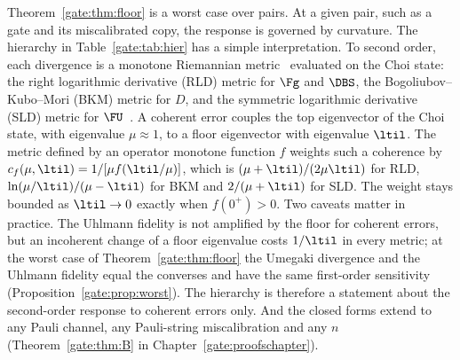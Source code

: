 Theorem~\ref{gate:thm:floor} is a worst case over pairs. At a given pair, such as a gate and its miscalibrated copy, the response is governed by curvature. The hierarchy in Table~\ref{gate:tab:hier} has a simple interpretation. To second order, each divergence is a monotone Riemannian metric~\cite{Petz1996} evaluated on the Choi state: the right logarithmic derivative (RLD) metric for $\Fg$ and $\DBS$, the Bogoliubov--Kubo--Mori (BKM) metric for $D$, and the symmetric logarithmic derivative (SLD) metric for $\FU$~\cite{Petz1996,BraunsteinCaves1994,KatariyaWilde2021b}. A coherent error couples the top eigenvector of the Choi state, with eigenvalue $\mu\approx1$, to a floor eigenvector with eigenvalue $\ltil$. The metric defined by an operator monotone function $f$ weights such a coherence by $c_f(\mu,\ltil)=1/[\mu f(\ltil/\mu)]$, which is $(\mu+\ltil)/(2\mu\ltil)$ for RLD, $\ln(\mu/\ltil)/(\mu-\ltil)$ for BKM and $2/(\mu+\ltil)$ for SLD. The weight stays bounded as $\ltil\to0$ exactly when $f(0^+)>0$. Two caveats matter in practice. The Uhlmann fidelity is not amplified by the floor for coherent errors, but an incoherent change of a floor eigenvalue costs $1/\ltil$ in every metric; at the worst case of Theorem~\ref{gate:thm:floor} the Umegaki divergence and the Uhlmann fidelity equal the converses and have the same first-order sensitivity (Proposition~\ref{gate:prop:worst}). The hierarchy is therefore a statement about the second-order response to coherent errors only. And the closed forms extend to any Pauli channel, any Pauli-string miscalibration and any $n$ (Theorem~\ref{gate:thm:B} in Chapter~\ref{gate:proofschapter}).

